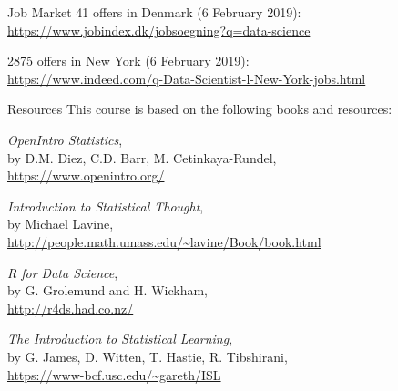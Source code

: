 \begin{frame}{Job Market}
    41 offers in Denmark (6 February 2019):\\
    \url{https://www.jobindex.dk/jobsoegning?q=data-science}
    
    2875 offers in New York (6 February 2019):\\
    \url{https://www.indeed.com/q-Data-Scientist-l-New-York-jobs.html}
\end{frame}

\begin{frame}{Resources}
    This course is based on the following books and resources:
    \begin{enumerate}
        {\small
        
        \item \textit{OpenIntro Statistics},\\
        by D.M. Diez, C.D. Barr, M. Cetinkaya-Rundel,\\
        \url{https://www.openintro.org/}
        
        \item \textit{Introduction to Statistical Thought},\\
        by Michael Lavine,\\ \url{http://people.math.umass.edu/~lavine/Book/book.html}
    
        \item \textit{R for Data Science},\\
        by G. Grolemund and H. Wickham,\\
        \url{http://r4ds.had.co.nz/}
    
        \item \textit{The Introduction to Statistical Learning},\\
        by G. James, D. Witten, T. Hastie, R. Tibshirani,\\
        \url{https://www-bcf.usc.edu/~gareth/ISL}
    
        }
    
    \end{enumerate}
\end{frame}


